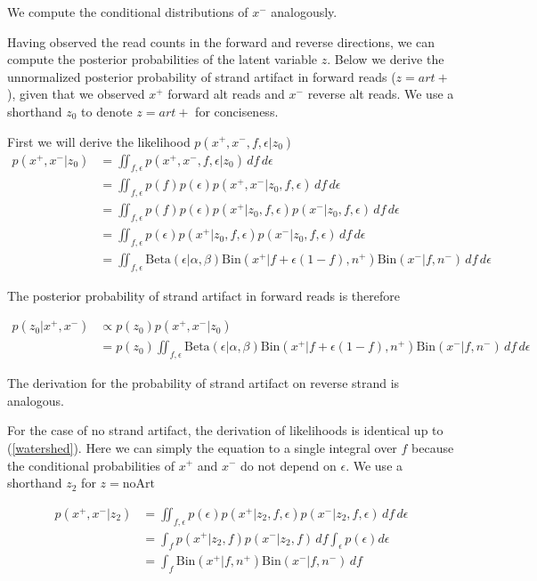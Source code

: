 \documentclass[nofootinbib,amssymb,amsmath]{revtex4}
\begin{document}
We compute the conditional distributions of $x^-$  analogously.

Having observed the read counts in the forward and reverse directions, we can compute the posterior probabilities of the latent variable $z$.  Below we derive the unnormalized posterior probability of strand artifact in forward reads ($z = art+$), given that we observed $x^+$ forward alt reads and $x^-$ reverse alt reads. We use a shorthand $z_0$ to denote $z=art+$ for conciseness. 

First we will derive the likelihood $p(x^+, x^-, f, \epsilon | z_0)$
\begin{align}
p(x^+, x^- | z_0)  &= \iint_{f, \epsilon}  p(x^+, x^-, f, \epsilon | z_0) \,df\,d\epsilon \\
			  &= \iint_{f, \epsilon}  p(f) p(\epsilon) p(x^+, x^- | z_0, f, \epsilon) \,df\,d\epsilon \\
			  &= \iint_{f, \epsilon}  p(f) p(\epsilon) p(x^+ | z_0, f, \epsilon) p(x^- | z_0, f, \epsilon) \,df\,d\epsilon \\
			  &= \iint_{f, \epsilon}  p(\epsilon) p(x^+ | z_0, f, \epsilon) p(x^- | z_0, f, \epsilon) \,df\,d\epsilon \label{watershed} \\
			  &= \iint_{f, \epsilon}  \mathrm{Beta}(\epsilon|\alpha, \beta) \mathrm{Bin}(x^+ | f + \epsilon(1-f), n^+) \mathrm{Bin}(x^- | f, n^-) \,df\,d\epsilon
\end{align}

The posterior probability of strand artifact in forward reads is therefore

\begin{align}
p(z_0 |x^+, x^-) & \propto p(z_0) p(x^+, x^- | z_0) \\
			 & = p(z_0) \iint_{f, \epsilon}  \mathrm{Beta}(\epsilon|\alpha, \beta) \mathrm{Bin}(x^+ | f + \epsilon(1-f), n^+) \mathrm{Bin}(x^- | f, n^-) \,df\,d\epsilon
\end{align}

The derivation for the probability of strand artifact on reverse strand is analogous.

For the case of no strand artifact, the derivation of likelihoods is identical up to (\ref{watershed}). Here we can simply the equation to a single integral over $f$ because the conditional probabilities of $x^+$ and $x^-$ do not depend on $\epsilon$. We use a shorthand $z_2$ for $z=\mathrm{noArt}$

\begin{align}
p(x^+, x^- | z_2)  &= \iint_{f, \epsilon}  p(\epsilon) p(x^+ | z_2, f, \epsilon) p(x^- | z_2, f, \epsilon) \,df\,d\epsilon \nonumber \\
			  &= \int_{f}  p(x^+ | z_2, f) p(x^- | z_2, f) \,df \int_{\epsilon}  p(\epsilon) d\epsilon \\
			  &= \int_{f}  \mathrm{Bin}(x^+ | f, n^+) \mathrm{Bin}(x^- | f, n^-) \,df
\end{align}
\end{document}
